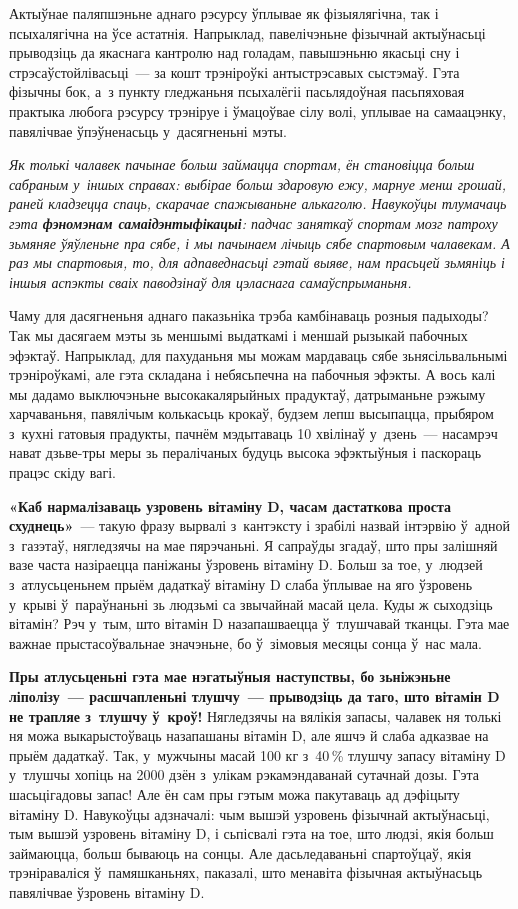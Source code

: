 Актыўнае паляпшэньне аднаго рэсурсу ўплывае як фізыялягічна, так і псыхалягічна на ўсе астатнія. Напрыклад, павелічэньне фізычнай актыўнасьці прыводзіць да якаснага кантролю над голадам, павышэньню якасьці сну і стрэсаўстойлівасьці~--- за кошт трэніроўкі антыстрэсавых сыстэмаў. Гэта фізычны бок, а~з пункту гледжаньня псыхалёгіі пасьлядоўная пасьпяховая практыка любога рэсурсу трэніруе і ўмацоўвае сілу волі, уплывае на самаацэнку, павялічвае ўпэўненасьць у~дасягненьні мэты.

\emph{Як толькі чалавек пачынае больш займацца спортам, ён становіцца больш сабраным у~іншых справах: выбірае больш здаровую ежу, марнуе менш грошай, раней кладзецца спаць, скарачае спажываньне алькаголю. Навукоўцы тлумачаць гэта \textbf{фэномэнам самаідэнтыфікацыі}: падчас заняткаў спортам мозг патроху зьмяняе ўяўленьне пра сябе, і мы пачынаем лічыць сябе спартовым чалавекам. А раз мы спартовыя, то, для адпаведнасьці гэтай выяве, нам прасьцей зьмяніць і іншыя аспэкты сваіх паводзінаў для цэласнага самаўспрыманьня.}

Чаму для дасягненьня аднаго паказьніка трэба камбінаваць розныя падыходы? Так мы дасягаем мэты зь меншымі выдаткамі і меншай рызыкай пабочных эфэктаў. Напрыклад, для пахуданьня мы можам мардаваць сябе зьнясільвальнымі трэніроўкамі, але гэта складана і небясьпечна на пабочныя эфэкты. А вось калі мы дадамо выключэньне высокакалярыйных прадуктаў, датрыманьне рэжыму харчаваньня, павялічым колькасьць крокаў, будзем лепш высыпацца, прыбяром з~кухні гатовыя прадукты, пачнём мэдытаваць 10 хвілінаў у~дзень~--- насамрэч нават дзьве-тры меры зь пералічаных будуць высока эфэктыўныя і паскораць працэс скіду вагі.

\textbf{«Каб нармалізаваць узровень вітаміну D, часам дастаткова проста схуднець»}~--- такую фразу вырвалі з~кантэксту і зрабілі назвай інтэрвію ў~адной з~газэтаў, нягледзячы на мае пярэчаньні. Я сапраўды згадаў, што пры залішняй вазе часта назіраецца паніжаны ўзровень вітаміну D. Больш за тое, у~людзей з~атлусьценьнем прыём дадаткаў вітаміну D слаба ўплывае на яго ўзровень у~крыві ў~параўнаньні зь людзьмі са звычайнай масай цела. Куды ж сыходзіць вітамін? Рэч у~тым, што вітамін D назапашваецца ў~тлушчавай тканцы. Гэта мае важнае прыстасоўвальнае значэньне, бо ў~зімовыя месяцы сонца ў~нас мала.

\textbf{Пры атлусьценьні гэта мае нэгатыўныя наступствы, бо зьніжэньне ліполізу~--- расшчапленьні тлушчу~--- прыводзіць да таго, што вітамін D не трапляе з~тлушчу ў~кроў!} Нягледзячы на вялікія запасы, чалавек ня толькі ня можа выкарыстоўваць назапашаны вітамін D, але яшчэ й слаба адказвае на прыём дадаткаў. Так, у~мужчыны масай 100 кг з~40\,\% тлушчу запасу вітаміну D у~тлушчы хопіць на 2000 дзён з~улікам рэкамэндаванай сутачнай дозы. Гэта шасьцігадовы запас! Але ён сам пры гэтым можа пакутаваць ад дэфіцыту вітаміну D. Навукоўцы адзначалі: чым вышэй узровень фізычнай актыўнасьці, тым вышэй узровень вітаміну D, і сьпісвалі гэта на тое, што людзі, якія больш займаюцца, больш бываюць на сонцы. Але дасьледаваньні спартоўцаў, якія трэніраваліся ў~памяшканьнях, паказалі, што менавіта фізычная актыўнасьць павялічвае ўзровень вітаміну D.

